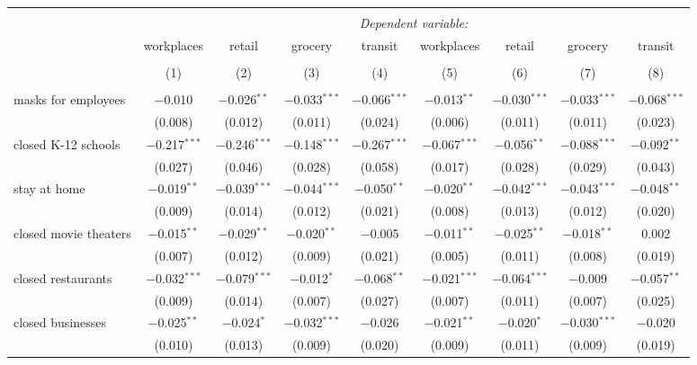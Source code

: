 \begin{tabular}{@{\extracolsep{1pt}}lcccccccc} 
\\[-1.8ex]\hline 
\hline \\[-1.8ex] 
 & \multicolumn{8}{c}{\textit{Dependent variable:}} \\ 
\cline{2-9} 
 & workplaces & retail & grocery & transit & workplaces & retail & grocery & transit \\ 
\\[-1.8ex] & (1) & (2) & (3) & (4) & (5) & (6) & (7) & (8)\\ 
\hline \\[-1.8ex] 
 masks for employees & $-$0.010 & $-$0.026$^{**}$ & $-$0.033$^{***}$ & $-$0.066$^{***}$ & $-$0.013$^{**}$ & $-$0.030$^{***}$ & $-$0.033$^{***}$ & $-$0.068$^{***}$ \\ 
  & (0.008) & (0.012) & (0.011) & (0.024) & (0.006) & (0.011) & (0.011) & (0.023) \\ 
  closed K-12 schools & $-$0.217$^{***}$ & $-$0.246$^{***}$ & $-$0.148$^{***}$ & $-$0.267$^{***}$ & $-$0.067$^{***}$ & $-$0.056$^{**}$ & $-$0.088$^{***}$ & $-$0.092$^{**}$ \\ 
  & (0.027) & (0.046) & (0.028) & (0.058) & (0.017) & (0.028) & (0.029) & (0.043) \\ 
  stay at home & $-$0.019$^{**}$ & $-$0.039$^{***}$ & $-$0.044$^{***}$ & $-$0.050$^{**}$ & $-$0.020$^{**}$ & $-$0.042$^{***}$ & $-$0.043$^{***}$ & $-$0.048$^{**}$ \\ 
  & (0.009) & (0.014) & (0.012) & (0.021) & (0.008) & (0.013) & (0.012) & (0.020) \\ 
  closed movie theaters & $-$0.015$^{**}$ & $-$0.029$^{**}$ & $-$0.020$^{**}$ & $-$0.005 & $-$0.011$^{**}$ & $-$0.025$^{**}$ & $-$0.018$^{**}$ & 0.002 \\ 
  & (0.007) & (0.012) & (0.009) & (0.021) & (0.005) & (0.011) & (0.008) & (0.019) \\ 
  closed restaurants & $-$0.032$^{***}$ & $-$0.079$^{***}$ & $-$0.012$^{*}$ & $-$0.068$^{**}$ & $-$0.021$^{***}$ & $-$0.064$^{***}$ & $-$0.009 & $-$0.057$^{**}$ \\ 
  & (0.009) & (0.014) & (0.007) & (0.027) & (0.007) & (0.011) & (0.007) & (0.025) \\ 
  closed businesses & $-$0.025$^{**}$ & $-$0.024$^{*}$ & $-$0.032$^{***}$ & $-$0.026 & $-$0.021$^{**}$ & $-$0.020$^{*}$ & $-$0.030$^{***}$ & $-$0.020 \\ 
  & (0.010) & (0.013) & (0.009) & (0.020) & (0.009) & (0.011) & (0.009) & (0.019) \\ 

\end{tabular}

